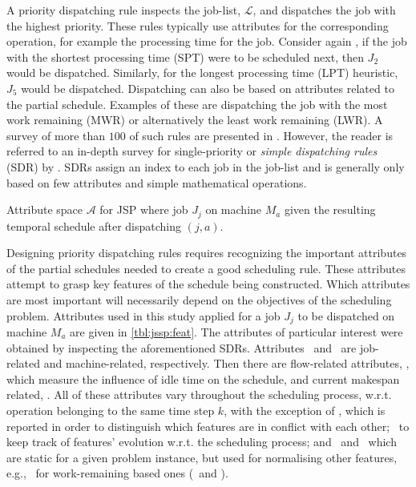 \documentclass[smallextended]{svjour3}
\begin{document}
A priority dispatching rule inspects the job-list, $\mathcal{L}$, and 
dispatches the job with the highest priority. 
These rules typically use attributes for the corresponding operation, for 
example the processing time for the job. 
Consider again , if the job with the shortest processing 
time (SPT) were to be scheduled next, then $J_2$ would be dispatched. 
Similarly, for the longest processing time (LPT) heuristic, $J_5$ would be 
dispatched. 
Dispatching can also be based on attributes related to the partial schedule. 
Examples of these are dispatching the job with the most work remaining (MWR) or 
alternatively the least work remaining (LWR). A survey of more than $100$ of 
such rules are presented in \citet{Panwalkar77}. 
However, the reader is referred to an in-depth survey for single-priority or 
\emph{simple dispatching rules} (SDR) by \citet{Haupt89}.  
SDRs assign an index to each job in the job-list and is generally only based on 
few attributes and simple mathematical operations.

\begin{table}[t!] \centering
	\caption[Attribute space $\mathcal{A}$ for JPS]{Attribute space $\mathcal{A}$ 
		for JSP where job $J_j$ on machine $M_a$ given the resulting temporal 
		schedule after dispatching $(j,a)$.
	}
	\label{tbl:jssp:feat}
	
\end{table}

Designing priority dispatching rules requires recognizing the important 
attributes of the partial schedules needed to create a good scheduling rule. 
These attributes attempt to grasp key features of the schedule being 
constructed. Which attributes are most important will necessarily depend on the
objectives of the scheduling problem. Attributes used in this study applied for 
a job $J_j$ to be dispatched on machine $M_a$ are given in \cref{tbl:jssp:feat}.
The attributes of particular interest were obtained by inspecting the 
aforementioned SDRs. Attributes \phiJobRelated\ and \phiMacRelated\ are 
job-related and machine-related, respectively. 
Then there are flow-related attributes, \phiFlowRelated, which measure the 
influence of idle time on the schedule, and current makespan related, 
\phiScheduleRelated.
All of these attributes vary throughout the scheduling process, w.r.t. 
operation belonging to the same time step $k$, with the exception of \phimac, 
which is reported in order to distinguish which features are in conflict with 
each other;
\phistep\ to keep track of features' evolution w.r.t. the scheduling process; 
and \phitotalProc\ and \phiwrmTotal\ which are static for a given problem 
instance, but used for normalising other features, e.g., \phiwrmTotal\ for 
work-remaining based ones (\phiwrmJob\ and \phiwrmMac).
\end{document}
